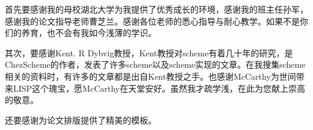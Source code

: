 \begin{acknowledgement}
%
首先要感谢我的母校湖北大学为我提供了优秀成长的环境，感谢我的班主任孙军，感谢我的论文指导老师曹芝兰。感谢各位老师的悉心指导与耐心教学。如果不是你们的养育，也不会有我如今浅薄的学识。

其次，要感谢Kent. R Dybvig教授，Kent教授对scheme有着几十年的研究，是ChezScheme的作者，发表了许多scheme以及scheme实现的文章。在我搜集scheme相关的资料时，有许多的文章都是出自Kent教授之手。也感谢McCarthy为世间带来LISP这个瑰宝，愿McCarthy在天堂安好。虽然我才疏学浅，在此为您献上崇高的敬意。

还要感谢\thuthesis 为论文排版提供了精美的模板。
\end{acknowledgement}
